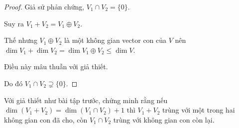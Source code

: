 \documentclass[class=linearalgebra,crop=false]{standalone}
\begin{document}
\begin{proof}Giả sử phản chứng, $V_{1}\cap V_{2} = \{ 0 \}$.
    \par Suy ra $V_{1} + V_{2} = V_{1}\oplus V_{2}$.
    \par Thế nhưng $V_{1}\oplus V_{2}$ là một không gian vector con của $V$ nên $\dim V_{1} + \dim V_{2} = \dim V_{1}\oplus V_{2} \le \dim V$.
    \par Điều này mâu thuẫn với giả thiết.
    \par Do đó $V_{1}\cap V_{2} \supsetneq \{ 0 \}$.
\end{proof}

\begin{exercise}Với giả thiết như bài tập trước, chứng minh rằng nếu $\dim(V_{1} + V_{2}) = \dim(V_{1}\cap V_{2}) + 1$ thì $V_{1} + V_{2}$ trùng với một trong hai không gian con đã cho, còn $V_{1}\cap V_{2}$ trùng với không gian con còn lại.
\end{exercise}
\end{document}
